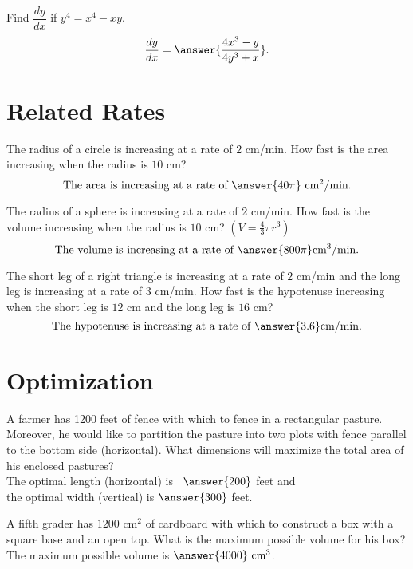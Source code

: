 \documentclass[handout]{ximera}
\begin{document}
\begin{problem}
Find $\dfrac{dy}{dx}$ if $ y^4 = x^4 - xy$.
\[\frac{dy}{dx} = \answer{\frac{4x^3 - y}{4y^3 +x}}.\]
\end{problem}

\section{Related Rates}
\begin{problem}
The radius of a circle is increasing at a rate of $2$ cm/min. 
How fast is the area increasing when the radius is $10$ cm?
\[\text{The area is increasing at a rate of} \ \answer{40\pi} \ \text{cm$^2$/min}.\]
\end{problem}

\begin{problem}
The radius of a sphere is increasing at a rate of $2$ cm/min. 
How fast is the volume increasing when the radius is $10$ cm? $(V= \frac43 \pi r^3)$
\[\text{The volume is increasing at a rate of} \ \answer{800\pi}  \text{cm$^3$/min}.\]
\end{problem}


\begin{problem}
The short leg of a right triangle is increasing at a rate of $2$ cm/min and 
the long leg is increasing at a rate of $3$ cm/min.
How fast is the hypotenuse increasing when the short 
leg is $12$ cm and the long leg is $16$ cm?
\[\text{The hypotenuse is increasing at a rate of} \ \answer{3.6} \text{cm/min}.\]
\end{problem}



\section{Optimization}

\begin{problem}
A farmer has 1200 feet of fence with which to fence in a rectangular pasture.  Moreover, he would like to partition the pasture into two plots with fence parallel to the bottom side (horizontal). What dimensions will maximize the total area of his enclosed pastures?\\
The optimal length (horizontal) is \ $\answer{200}$ feet and\\
the optimal width (vertical) is $\answer{300}$ feet.
\end{problem}

\begin{problem}
A fifth grader has $1200$ cm$^2$ of cardboard with which to construct a box with a square base and an open top. What is the maximum possible volume for his box?\\
The maximum possible volume is $\answer{4000} \  \text{cm}^3$.
\end{problem}
\end{document}

